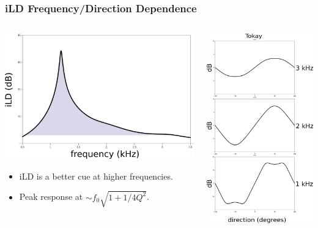 \documentclass{beamer}
\begin{document}
\begin{frame}[t]
\frametitle{iLD Frequency/Direction Dependence}
\begin{columns}
\begin{column}{0.5\textwidth}
 \includegraphics[width = 6 cm]{Diagrams/Presentation/iLDspectrum.png}
\begin{exampleblock}{}
\small
 \begin{itemize}
  \item iLD is a better cue at higher frequencies.
  \item Peak response at $\sim f_0\sqrt{1+1/4Q^2}$.
 \end{itemize}
\end{exampleblock}
\end{column}
     \begin{column}{0.5\textwidth}
     \flushright
 \includegraphics[width = 3.6 cm]{Diagrams/Presentation/iLDdirection.png}
\end{column}
\end{columns}
\end{frame}
\end{document}
